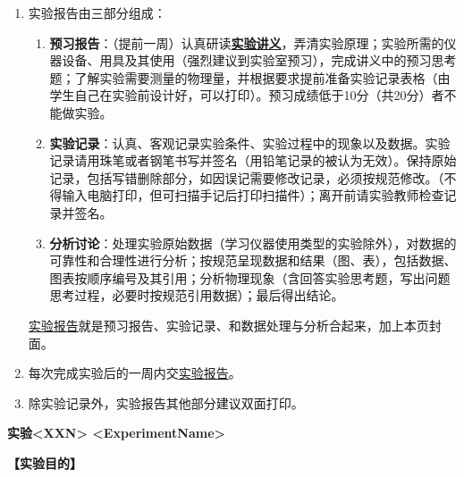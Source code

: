 \documentclass{ctexart}
\numberwithin{equation}{section}%
\newcommand{\ExpTitle}{实验<XXN> <ExperimentName>}
\theoremstyle{ansstyle}
\begin{document}
\begin{enumerate}
    \item 实验报告由三部分组成：
    \begin{enumerate}
        \item \textbf{预习报告}：（提前一周）认真研读\underline{\textbf{实验讲义}}，弄清实验原理；实验所需的仪器设备、用具及其使用（强烈建议到实验室预习），完成讲义中的预习思考题；了解实验需要测量的物理量，并根据要求提前准备实验记录表格（由学生自己在实验前设计好，可以打印）。预习成绩低于10分（共20分）者不能做实验。
        \item \textbf{实验记录}：认真、客观记录实验条件、实验过程中的现象以及数据。实验记录请用珠笔或者钢笔书写并签名（{\color{red}用铅笔记录的被认为无效}）。{\color{red}保持原始记录，包括写错删除部分，如因误记需要修改记录，必须按规范修改。}（不得输入电脑打印，但可扫描手记后打印扫描件）；离开前请实验教师检查记录并签名。
        \item \textbf{分析讨论}：处理实验原始数据（学习仪器使用类型的实验除外），对数据的可靠性和合理性进行分析；按规范呈现数据和结果（图、表），包括数据、图表按顺序编号及其引用；分析物理现象（含回答实验思考题，写出问题思考过程，必要时按规范引用数据）；最后得出结论。
    \end{enumerate}
    \underline{实验报告}就是预习报告、实验记录、和数据处理与分析合起来，加上本页封面。
    \item 每次完成实验后的一周内交\underline{实验报告}。
    \item 除实验记录外，实验报告其他部分建议双面打印。
\end{enumerate}



\newpage
\tableofcontents

\begin{center}
    \LARGE{\textbf{\ExpTitle}}
\end{center}


\large{\textbf{【实验目的】}}%
\end{document}
